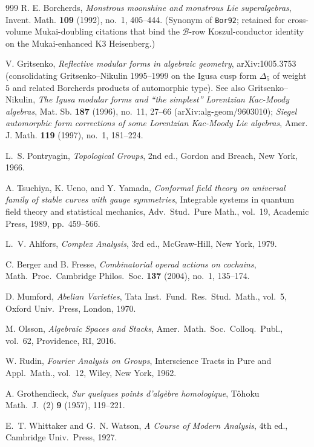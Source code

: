 \begin{thebibliography}{999}
R. E. Borcherds, \emph{Monstrous moonshine and monstrous Lie superalgebras}, Invent. Math. \textbf{109} (1992), no.~1, 405--444. (Synonym of \texttt{Bor92}; retained for cross-volume Mukai-doubling citations that bind the $\mathcal{B}$-row Koszul-conductor identity on the Mukai-enhanced K3 Heisenberg.)

V. Gritsenko, \emph{Reflective modular forms in algebraic geometry}, arXiv:1005.3753 (consolidating Gritsenko--Nikulin 1995--1999 on the Igusa cusp form $\Delta_5$ of weight $5$ and related Borcherds products of automorphic type). See also Gritsenko--Nikulin, \emph{The Igusa modular forms and ``the simplest'' Lorentzian Kac-Moody algebras}, Mat. Sb. \textbf{187} (1996), no.~11, 27--66 (arXiv:alg-geom/9603010); \emph{Siegel automorphic form corrections of some Lorentzian Kac-Moody Lie algebras}, Amer. J. Math. \textbf{119} (1997), no.~1, 181--224.

L.~S. Pontryagin, \emph{Topological Groups}, 2nd ed., Gordon and Breach, New York, 1966.

A. Tsuchiya, K. Ueno, and Y. Yamada, \emph{Conformal field theory on universal family of stable curves with gauge symmetries}, Integrable systems in quantum field theory and statistical mechanics, Adv.\ Stud.\ Pure Math., vol.~19, Academic Press, 1989, pp.~459--566.

L.~V. Ahlfors, \emph{Complex Analysis}, 3rd ed., McGraw-Hill, New York, 1979.

C. Berger and B. Fresse, \emph{Combinatorial operad actions on cochains}, Math.\ Proc.\ Cambridge Philos.\ Soc. \textbf{137} (2004), no.~1, 135--174.

D. Mumford, \emph{Abelian Varieties}, Tata Inst.\ Fund.\ Res.\ Stud.\ Math., vol.~5, Oxford Univ.\ Press, London, 1970.

M. Olsson, \emph{Algebraic Spaces and Stacks}, Amer.\ Math.\ Soc.\ Colloq.\ Publ., vol.~62, Providence, RI, 2016.

W. Rudin, \emph{Fourier Analysis on Groups}, Interscience Tracts in Pure and Appl.\ Math., vol.~12, Wiley, New York, 1962.

A. Grothendieck, \emph{Sur quelques points d'alg\`ebre homologique}, T\^ohoku Math.~J.\ (2) \textbf{9} (1957), 119--221.

E.~T. Whittaker and G.~N. Watson, \emph{A Course of Modern Analysis}, 4th ed., Cambridge Univ.\ Press, 1927.


\end{thebibliography}
